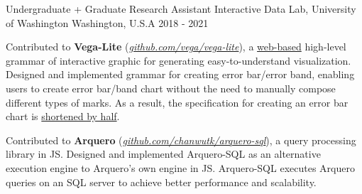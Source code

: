 \begin{cventries}
  \cvwork
    {Undergraduate + Graduate Research Assistant} %
    {Interactive Data Lab, University of Washington} %
    {Washington, U.S.A} %
    {2018 - 2021} %
    {
      \begin{cvitems} %
        \item {
          Contributed to \textbf{Vega-Lite} (\href{https://www.github.com/vega/vega-lite}{\textit{github.com/vega/vega-lite}}), a \underline{web-based} high-level grammar of interactive graphic for generating easy-to-understand visualization.
          Designed and implemented grammar for creating error bar/error band,
          enabling users to create error bar/band chart without the need to manually compose different types of marks.
          As a result, the specification for creating an error bar chart is \underline{shortened by half}.
        }
        \item {
          Contributed to \textbf{Arquero} (\href{https://www.github.com/chanwutk/arquero-sql}{\textit{github.com/chanwutk/arquero-sql}}), a query processing library in JS.
          Designed and implemented Arquero-SQL as an alternative execution engine to Arquero's own engine in JS.
          Arquero-SQL executes Arquero queries on an SQL server to achieve better performance and scalability.
        }
      \end{cvitems}
    }



\end{cventries}
